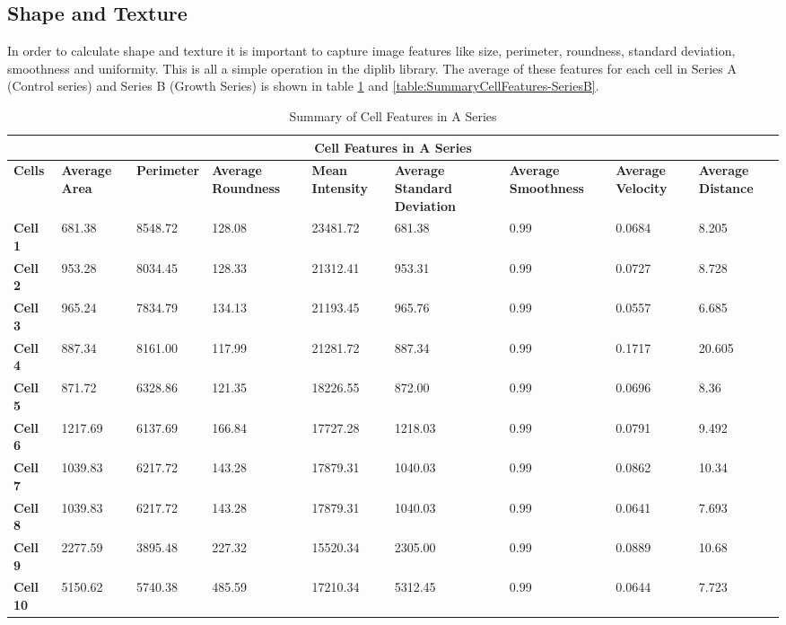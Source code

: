 \documentclass{article}
\begin{document}
\subsection*{Shape and Texture}
In order to calculate shape and texture it is important to capture image features like size, perimeter, roundness, standard deviation, smoothness and uniformity. This is all a simple operation in the diplib library. The average of these features for each cell in Series A (Control series) and Series B (Growth Series) is shown in table \ref{table:SummaryCellFeatures-SeriesA} and \ref{table:SummaryCellFeatures-SeriesB}.

\begin{table}[h!]
\centering
\caption{Summary of Cell Features in A Series}\label{table:SummaryCellFeatures-SeriesA}
\begin{tabular}{|p{1.2cm}|p{1.5cm}|p{1.5cm}|p{1.5cm}|p{1.7cm}|p{1.5cm}|p{1.7cm}|p{1.5cm}|p{1.7cm}|}
\hline
\multicolumn{9}{|c|}{\textbf{Cell Features in A Series}} \\
\hline
\textbf{Cells} & \textbf{Average Area} & \textbf{Perimeter} & \textbf{Average Roundness} & \textbf{Mean Intensity} & \textbf{Average Standard Deviation} & \textbf{Average Smoothness} & \textbf{Average Velocity} & \textbf{Average Distance} \\
\hline
\textbf{Cell 1} & 681.38 & 8548.72 & 128.08 & 23481.72 & 681.38 & 0.99 & 0.0684 & 8.205 \\
\textbf{Cell 2} & 953.28 & 8034.45 & 128.33 & 21312.41 & 953.31 & 0.99 & 0.0727 & 8.728 \\
\textbf{Cell 3} & 965.24 & 7834.79 & 134.13 & 21193.45 & 965.76 & 0.99 & 0.0557 & 6.685 \\
\textbf{Cell 4} & 887.34 & 8161.00 & 117.99 & 21281.72 & 887.34 & 0.99 & 0.1717 & 20.605 \\
\textbf{Cell 5} & 871.72 & 6328.86 & 121.35 & 18226.55 & 872.00 & 0.99 & 0.0696 & 8.36 \\
\textbf{Cell 6} & 1217.69 & 6137.69 & 166.84 & 17727.28 & 1218.03 & 0.99 & 0.0791 & 9.492 \\
\textbf{Cell 7} & 1039.83 & 6217.72 & 143.28 & 17879.31 & 1040.03 & 0.99 & 0.0862 & 10.34 \\
\textbf{Cell 8} & 1039.83 & 6217.72 & 143.28 & 17879.31 & 1040.03 & 0.99 & 0.0641 & 7.693 \\
\textbf{Cell 9} & 2277.59 & 3895.48 & 227.32 & 15520.34 & 2305.00 & 0.99 & 0.0889 & 10.68 \\
\textbf{Cell 10} & 5150.62 & 5740.38 & 485.59 & 17210.34 & 5312.45 & 0.99 & 0.0644 & 7.723 \\

\end{tabular}
\end{table}
\end{document}
